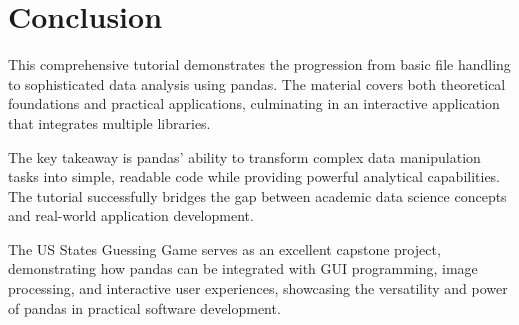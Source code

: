 \documentclass[12pt]{article}
\begin{document}
\section{Conclusion}

This comprehensive tutorial demonstrates the progression from basic file handling to sophisticated data analysis using pandas. The material covers both theoretical foundations and practical applications, culminating in an interactive application that integrates multiple libraries.

The key takeaway is pandas' ability to transform complex data manipulation tasks into simple, readable code while providing powerful analytical capabilities. The tutorial successfully bridges the gap between academic data science concepts and real-world application development.

The US States Guessing Game serves as an excellent capstone project, demonstrating how pandas can be integrated with GUI programming, image processing, and interactive user experiences, showcasing the versatility and power of pandas in practical software development.
\end{document}
